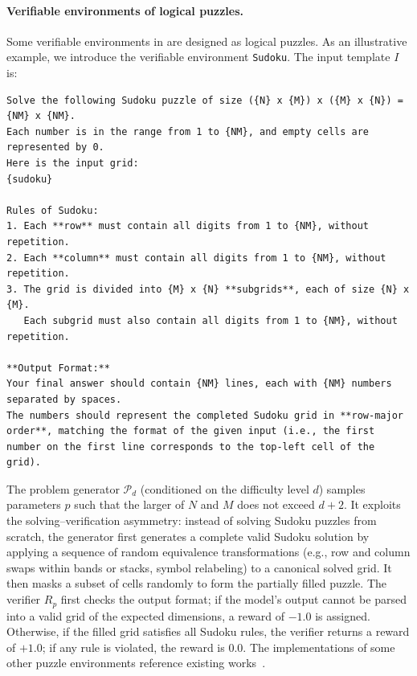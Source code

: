 \documentclass{article}
\theoremstyle{plain}
\theoremstyle{definition}
\theoremstyle{remark}
\begin{document}
\paragraph{Verifiable environments of logical puzzles.}
Some verifiable environments in \suite{} are designed as logical puzzles.
As an illustrative example, we introduce the verifiable environment \texttt{Sudoku}. The input template $I$ is:
\begin{lstlisting}[language={},caption={},label={}]
Solve the following Sudoku puzzle of size ({N} x {M}) x ({M} x {N}) = {NM} x {NM}.
Each number is in the range from 1 to {NM}, and empty cells are represented by 0.
Here is the input grid:
{sudoku}

Rules of Sudoku:
1. Each **row** must contain all digits from 1 to {NM}, without repetition.
2. Each **column** must contain all digits from 1 to {NM}, without repetition.
3. The grid is divided into {M} x {N} **subgrids**, each of size {N} x {M}.
   Each subgrid must also contain all digits from 1 to {NM}, without repetition.

**Output Format:**
Your final answer should contain {NM} lines, each with {NM} numbers separated by spaces.
The numbers should represent the completed Sudoku grid in **row-major order**, matching the format of the given input (i.e., the first number on the first line corresponds to the top-left cell of the grid).
\end{lstlisting}
The problem generator $\mathcal{P}_{d}$ (conditioned on the difficulty level $d$) samples parameters $p$ such that the larger of $N$ and $M$ does not exceed $d + 2$.
It exploits the solving–verification asymmetry: instead of solving Sudoku puzzles from scratch, the generator first generates a complete valid Sudoku solution by applying a sequence of random equivalence transformations (e.g., row and column swaps within bands or stacks, symbol relabeling) to a canonical solved grid.
It then masks a subset of cells randomly to form the partially filled puzzle.
The verifier $R_{p}$ first checks the output format; if the model’s output cannot be parsed into a valid grid of the expected dimensions, a reward of $-1.0$ is assigned.
Otherwise, if the filled grid satisfies all Sudoku rules, the verifier returns a reward of $+1.0$; if any rule is violated, the reward is $0.0$.
The implementations of some other puzzle environments reference existing works~\citep{xie2024memorization-reasoning,chen2025enigmata}.
\end{document}
